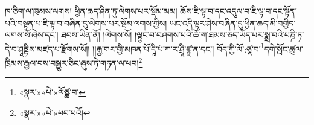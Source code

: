 ཁ་ཅིག་ལ་ཁུམས་ལགས། ཕྱིན་ཆད་ཤིན་ཏུ་ལེགས་པར་སྡོམ་མམ། ཆོས་ཇི་ལྟ་བ་དང་འདུལ་བ་ཇི་ལྟ་བ་དང་སྟོན་པའི་བསྟན་པ་ཇི་ལྟ་བ་བཞིན་དུ་ལེགས་པར་སྡོམ་ལགས་ཀྱིས། ཡང་འདི་ལྟར་ཤེས་བཞིན་དུ་ཕྱིན་ཆད་མི་བགྱིད་ལགས་སོ་ཞེས་དང་། ཐབས་ཡིན་ནོ། །ལེགས་སོ། །ལྟུང་བ་བཤགས་པའི་ཆོ་ག་ཐམས་ཅད་ཡོད་པར་སྨྲ་བའི་པཎྜི་ཏ་དེ་བ་ཤཱནྟིས་མཛད་པ་རྫོགས་སོ།། །།རྒྱ་གར་གྱི་མཁན་པོ་དཱི་པཾ་ཀ་ར་ཤྲཱི་ཛྙཱ་ན་དང་། བོད་ཀྱི་ལོ་:ཙཱ་བ་\footnote{«སྣར་»«པེ་»ལོཙྪ་བ་}དགེ་སློང་ཚུལ་ཁྲིམས་རྒྱལ་བས་བསྒྱུར་ཅིང་ཞུས་ཏེ་གཏན་ལ་ཕབ།\footnote{«སྣར་»«པེ་»ཕབ་པའོ།} 